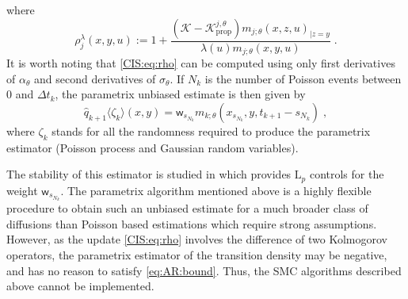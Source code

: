 \documentclass{article}
\newcommand{\parvec}{\theta}
\newcommand{\hd}[1]{q_{#1}}
\newcommand{\hdhat}[1]{\widehat{q}_{#1}}
\newcommand{\eqdef}{\ensuremath{:=}}
\newcommand{\eqsp}{\;}
\begin{document}
where
\begin{equation}
\label{CIS:eq:rho}
\rho^{\lambda}_j\left(x,y,u\right)\eqdef 1+\frac{\left(\mathcal{K}-\mathcal{K}^{j,\theta}_{\mathrm{prop}}\right)m_{j;\parvec}\left(x,z,u\right)_{|z=y}}{\lambda(u)m_{j;\parvec}\left(x,y,u\right)}\eqsp.
\end{equation}
It is worth noting that \eqref{CIS:eq:rho} can be computed using only first derivatives of $\alpha_{\parvec}$ and second derivatives of $\sigma_\parvec$. 
If $N_k$ is the number of Poisson events between $0$ and $\Delta t_{k}$, the parametrix unbiased estimate is then given by 
\[
\hdhat{k+1}\langle \zeta_k\rangle(x,y) = \mathsf{w}_{s_{N_k}}m_{k;\parvec}\left(x_{s_{N_k}},y,t_{k+1} - s_{N_k}\right) \eqsp,
\]
where $\zeta_k$ stands for all the randomness required to produce the parametrix estimator (Poisson process and Gaussian random variables).

The stability of this estimator is studied in \cite{fearnhead2017continuous} which provides $\mathrm{L}_p$ controls for the weight $\mathsf{w}_{s_{N_k}}$. 
The parametrix algorithm mentioned above is a highly flexible procedure to obtain such an unbiased estimate for a much broader class of diffusions than Poisson based estimations which require strong assumptions. 
However, as the update \eqref{CIS:eq:rho} involves the difference of two Kolmogorov operators, the parametrix estimator of the transition density may be negative, and has no reason to satisfy \eqref{eq:AR:bound}.
Thus, the SMC algorithms described above cannot be implemented.



\end{document}
